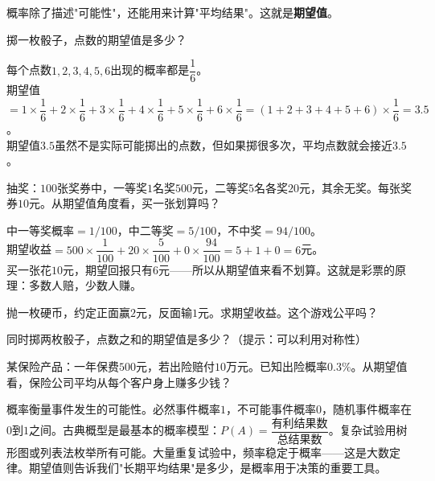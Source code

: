 
概率除了描述"可能性"，还能用来计算"平均结果"。这就是\textbf{期望值}。

\begin{example}
掷一枚骰子，点数的期望值是多少？
\end{example}
\begin{solution}
每个点数$1,2,3,4,5,6$出现的概率都是$\dfrac16$。\\
期望值$=1\times\dfrac16+2\times\dfrac16+3\times\dfrac16+4\times\dfrac16+5\times\dfrac16+6\times\dfrac16
=(1+2+3+4+5+6)\times\dfrac16=3.5$。\\
期望值$3.5$虽然不是实际可能掷出的点数，但如果掷很多次，平均点数就会接近$3.5$。
\end{solution}

\begin{example}
抽奖：$100$张奖券中，一等奖$1$名奖$500$元，二等奖$5$名各奖$20$元，其余无奖。每张奖券$10$元。从期望值角度看，买一张划算吗？
\end{example}
\begin{solution}
中一等奖概率$=1/100$，中二等奖$=5/100$，不中奖$=94/100$。\\
期望收益$=500\times\dfrac1{100}+20\times\dfrac5{100}+0\times\dfrac{94}{100}=5+1+0=6$元。\\
买一张花$10$元，期望回报只有$6$元——所以从期望值来看不划算。这就是彩票的原理：多数人赔，少数人赚。
\end{solution}


\begin{exercise}
\item 抛一枚硬币，约定正面赢$2$元，反面输$1$元。求期望收益。这个游戏公平吗？
\item 同时掷两枚骰子，点数之和的期望值是多少？（提示：可以利用对称性）
\item 某保险产品：一年保费$500$元，若出险赔付$10$万元。已知出险概率$0.3\%$。从期望值看，保险公司平均从每个客户身上赚多少钱？
\end{exercise}


概率衡量事件发生的可能性。必然事件概率$1$，不可能事件概率$0$，随机事件概率在$0$到$1$之间。古典概型是最基本的概率模型：$P(A)=\dfrac{\text{有利结果数}}{\text{总结果数}}$。复杂试验用树形图或列表法枚举所有可能。大量重复试验中，频率稳定于概率——这是大数定律。期望值则告诉我们"长期平均结果"是多少，是概率用于决策的重要工具。

